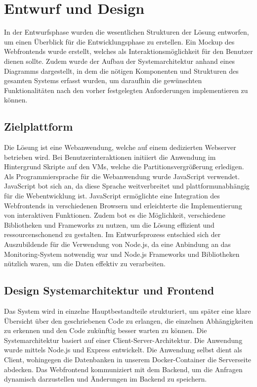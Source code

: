 \section{Entwurf und Design}\label{sec:entwurf-und-design}
In der Entwurfsphase wurden die wesentlichen Strukturen der Lösung entworfen, um einen Überblick für die Entwicklungsphase zu erstellen.
Ein Mockup des Webfrontends wurde erstellt, welches als Interaktionsmöglichkeit für den Benutzer dienen sollte.
Zudem wurde der Aufbau der Systemarchitektur anhand eines Diagramms dargestellt, in dem die nötigen Komponenten und Strukturen des gesamten Systems erfasst wurden, um daraufhin die gewünschten Funktionalitäten nach den vorher festgelegten Anforderungen implementieren zu können.

\subsection{Zielplattform}\label{subsec:zielplattform}
Die Lösung ist eine Webanwendung, welche auf einem dedizierten Webserver betrieben wird.
Bei Benutzerinteraktionen initiiert die Anwendung im Hintergrund Skripte auf den VMs, welche die Partitionsvergrößerung erledigen.
Als Programmiersprache für die Webanwendung wurde JavaScript verwendet.
JavaScript bot sich an, da diese Sprache weitverbreitet und plattformunabhängig für die Webentwicklung ist.
JavaScript ermöglichte eine Integration des Webfrontends in verschiedenen Browsern und erleichterte die Implementierung von interaktiven Funktionen.
Zudem bot es die Möglichkeit, verschiedene Bibliotheken und Frameworks zu nutzen, um die Lösung effizient und ressourcenschonend zu gestalten.
Im Entwurfsprozess entschied sich der Auszubildende für die Verwendung von Node.js, da eine Anbindung an das Monitoring-System notwendig war und Node.js Frameworks und Bibliotheken nützlich waren, um die Daten effektiv zu verarbeiten.


\subsection{Design Systemarchitektur und Frontend}\label{subsec:design-systemarchitektur-und-frontend}
Das System wird in einzelne Hauptbestandteile strukturiert, um später eine klare Übersicht über den geschriebenen Code zu erlangen, die einzelnen Abhängigkeiten zu erkennen und den Code zukünftig besser warten zu können.
Die Systemarchitektur basiert auf einer Client-Server-Architektur.
Die Anwendung wurde mittels Node.js und Express entwickelt.
Die Anwendung selbst dient als Client, wohingegen die Datenbanken in unserem Docker-Container die Serverseite abdecken.
Das Webfrontend kommuniziert mit dem Backend, um die Anfragen dynamisch darzustellen und Änderungen im Backend zu speichern.

